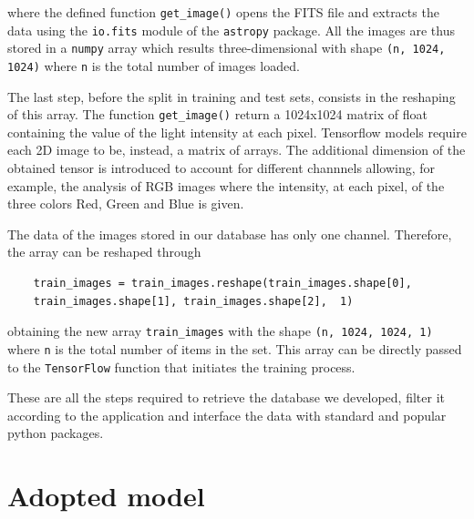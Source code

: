 \documentclass[a4paper,10pt]{report}
\begin{document}
where the defined function \lstinline{get_image()} opens the FITS file 
and extracts
the data using the \lstinline{io.fits} module of 
the \lstinline{astropy} package. All the images are thus
stored in a \lstinline{numpy} array which results three-dimensional 
with shape \lstinline{(n, 1024, 1024)} where \lstinline{n} is the total number of images loaded.

The last step, before the split in training and test sets, consists 
in the reshaping of this array. The  
function \lstinline{get_image()} return a 1024x1024 matrix of float containing
the value of the light intensity at each pixel. 
Tensorflow models require each 2D image to be, instead, a matrix of arrays.
The additional dimension of the obtained tensor is introduced to account for 
different channnels allowing, for example, the analysis of RGB images where 
the intensity, at each pixel, of the three colors Red, Green and Blue is given.

The data of the images stored in our database has only one channel. Therefore,
the array can be reshaped through

\begin{lstlisting}
    train_images = train_images.reshape(train_images.shape[0], 
    train_images.shape[1], train_images.shape[2],  1)
\end{lstlisting}

obtaining the new array \lstinline{train_images} with the shape \lstinline{(n, 1024, 1024, 1)}
where \lstinline{n} is the total number of items in the set.
This array can be directly passed to the \lstinline{TensorFlow} function that initiates
the training process.

These are all the steps required to retrieve the database we developed, filter it according to the application
and interface the data with standard and popular python packages.

\section{Adopted model}

\end{document}

